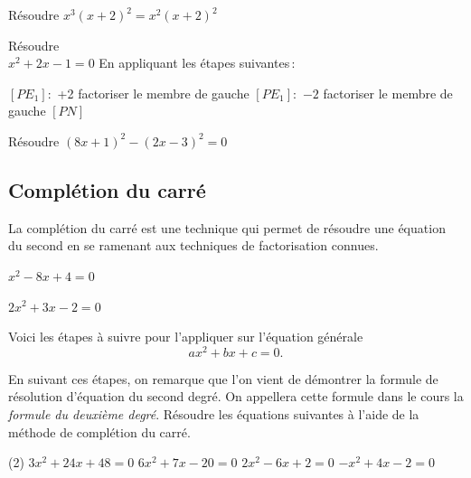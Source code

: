 \documentclass[a4paper,12pt]{article}
\begin{document}
\begin{exemple}
	Résoudre $x^3(x+2)^2=x^2(x+2)^2$
	\tcblower
	\vspace{10cm}

\end{exemple}

\begin{exemple}
	Résoudre \\$x^2+2x-1=0$
	\tcblower
	En appliquant les étapes suivantes\,:

	\begin{tasks}
\task $\left[P E_1\right]:$ +2
\vspace{1.5cm}
\task factoriser le membre de gauche
\vspace{1.5cm}
\task $\left[P E_1\right]:$ $-2$
\vspace{1.5cm}
\task factoriser le membre de gauche
\vspace{1.5cm}
\task $\left[P N\right]$
\vspace{1.5cm}
	\end{tasks}
\end{exemple}

\begin{exemple}
	Résoudre $(8x+1)^2-(2x-3)^2=0$
	\tcblower
	\vspace{11cm}	
\end{exemple}
\newpage
\subsection{Complétion du carré}
La complétion du carré est une technique qui permet de résoudre une équation du second en se ramenant aux techniques de factorisation connues.
\begin{exemple}
	$x^2-8x+4=0$
	\tcblower
	\vspace{10cm}	

\end{exemple}

\begin{exemple}
	$2x^2+3x-2=0$
	\tcblower
	\vspace{10cm}	

\end{exemple}
\newpage
Voici les étapes à suivre pour l'appliquer sur l'équation générale 
\[ax^2+bx+c=0.\]
	\vspace{20cm}

En suivant ces étapes, on remarque que l'on vient de démontrer la formule de résolution d'équation du second degré. On appellera cette formule dans le cours la \emph{formule du deuxième degré}.
Résoudre les équations suivantes à l'aide de la méthode de complétion du carré.
\begin{tasks}(2)
 \task $3 x^2+24 x+48=0$
 \task $6 x^2+7 x-20=0$
 \task $2 x^2-6 x+2=0$
 \task $-x^2+4 x-2=0$
\end{tasks}
\end{document}
